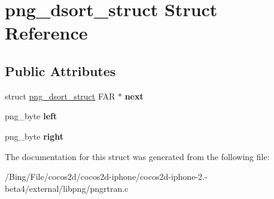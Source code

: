 \hypertarget{structpng__dsort__struct}{\section{png\-\_\-dsort\-\_\-struct Struct Reference}
\label{structpng__dsort__struct}
}
\subsection*{Public Attributes}
\begin{DoxyCompactItemize}
\item 
\hypertarget{structpng__dsort__struct_a1220c12ccc8d2eb1f3c0f49548efdfe7}{struct \hyperlink{structpng__dsort__struct}{png\-\_\-dsort\-\_\-struct} F\-A\-R $\ast$ {\bfseries next}}\label{structpng__dsort__struct_a1220c12ccc8d2eb1f3c0f49548efdfe7}

\item 
\hypertarget{structpng__dsort__struct_a09ba275bb5489f22e906be30b63f5452}{png\-\_\-byte {\bfseries left}}\label{structpng__dsort__struct_a09ba275bb5489f22e906be30b63f5452}

\item 
\hypertarget{structpng__dsort__struct_a9cfe3ab6de9319c0d18dd16075c21fa2}{png\-\_\-byte {\bfseries right}}\label{structpng__dsort__struct_a9cfe3ab6de9319c0d18dd16075c21fa2}

\end{DoxyCompactItemize}


The documentation for this struct was generated from the following file\-:\begin{DoxyCompactItemize}
\item 
/\-Bing/\-File/cocos2d/cocos2d-\/iphone/cocos2d-\/iphone-\/2.-\/beta4/external/libpng/pngrtran.\-c\end{DoxyCompactItemize}
